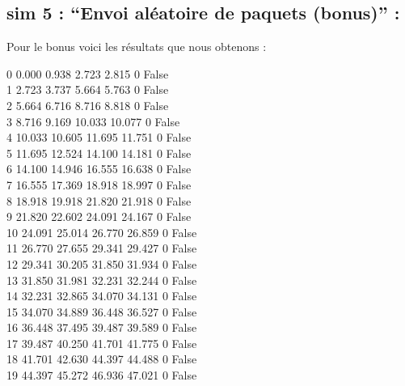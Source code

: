 \documentclass[a4paper, 12pt]{report}
\begin{document}
\subsection*{sim 5 : “Envoi aléatoire de paquets (bonus)” :}
Pour le bonus voici les résultats que nous obtenons :
\begin{center}
0 0.000 0.938 2.723 2.815 0 False\\
1 2.723 3.737 5.664 5.763 0 False\\
2 5.664 6.716 8.716 8.818 0 False\\ 
3 8.716 9.169 10.033 10.077 0 False\\
4 10.033 10.605 11.695 11.751 0 False\\
5 11.695 12.524 14.100 14.181 0 False\\
6 14.100 14.946 16.555 16.638 0 False\\
7 16.555 17.369 18.918 18.997 0 False\\
8 18.918 19.918 21.820 21.918 0 False\\
9 21.820 22.602 24.091 24.167 0 False\\
10 24.091 25.014 26.770 26.859 0 False\\
11 26.770 27.655 29.341 29.427 0 False\\
12 29.341 30.205 31.850 31.934 0 False\\
13 31.850 31.981 32.231 32.244 0 False\\
14 32.231 32.865 34.070 34.131 0 False\\
15 34.070 34.889 36.448 36.527 0 False\\
16 36.448 37.495 39.487 39.589 0 False\\
17 39.487 40.250 41.701 41.775 0 False\\
18 41.701 42.630 44.397 44.488 0 False\\
19 44.397 45.272 46.936 47.021 0 False\\
\end{center}
\end{document}
